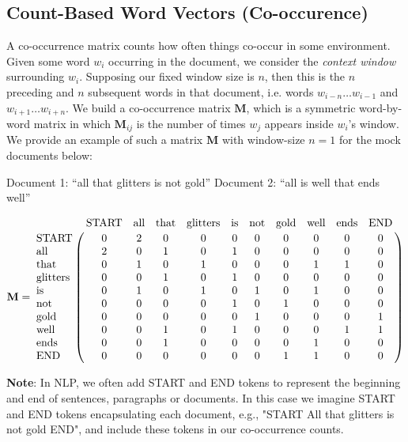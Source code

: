 \subsection{Count-Based Word Vectors (Co-occurence)}

A co-occurrence matrix counts how often things co-occur in some environment. Given some word $w_i$ occurring in the document, we consider the \textit{context window} surrounding $w_i$. Supposing our fixed window size is $n$, then this is the $n$ preceding and  $n$ subsequent words in that document, i.e. words  $w_{i-n} \dots w_{i-1}$ and $w_{i+1} \dots w_{i+n}$. We build a co-occurrence matrix $\textbf{M}$, which is a symmetric word-by-word matrix in which $\textbf{M}_{ij}$ is the number of times  $w_{j}$ appears inside $w_{i}$'s window. We provide an example of such a matrix $\textbf{M}$ with window-size $n=1$ for the mock documents below:\newline

Document 1: ``all that glitters is not gold''\newline
Document 2: ``all is well that ends well'' \newline

\begin{equation*}
\textbf{M} = \bordermatrix{& \text{START} & \text{all}& \text{that}& \text{glitters}& \text{is} & \text{not} & \text{gold} & \text{well} & \text{ends} & \text{END}\cr
                \text{START} & 0 & 2 & 0 & 0 & 0 & 0 & 0 & 0 & 0 & 0 \cr
                \text{all} & 2 & 0 & 1 & 0 & 1 & 0 & 0 & 0 & 0 & 0 \cr
                \text{that}& 0 & 1 & 0 & 1 & 0 & 0 & 0 & 1 & 1 & 0 \cr
                \text{glitters}& 0 & 0 & 1 & 0 & 1 & 0 & 0 & 0 & 0 & 0 \cr
                \text{is}& 0 & 1 & 0 & 1 & 0 & 1 & 0 & 1 & 0 & 0 \cr
                \text{not}& 0 & 0 & 0 & 0 & 1 & 0 & 1 & 0 & 0 & 0 \cr
                \text{gold}& 0 & 0 & 0 & 0 & 0 & 1 & 0 & 0 & 0 & 1 \cr
                \text{well}& 0 & 0 & 1 & 0 & 1 & 0 & 0 & 0 & 1 & 1\cr
                \text{ends}& 0 & 0 & 1 & 0 & 0 & 0 & 0 & 1 & 0 & 0\cr
                \text{END}& 0 & 0 & 0 & 0 & 0 & 0 & 1 & 1 & 0 & 0\cr
                }
\end{equation*}
\vspace{15pt}

\textbf{Note}: In NLP, we often add START and END tokens to represent the beginning and end of sentences, paragraphs or documents. In this case we imagine START and END tokens encapsulating each document, e.g., "START All that glitters is not gold END", and include these tokens in our co-occurrence counts.\newline

